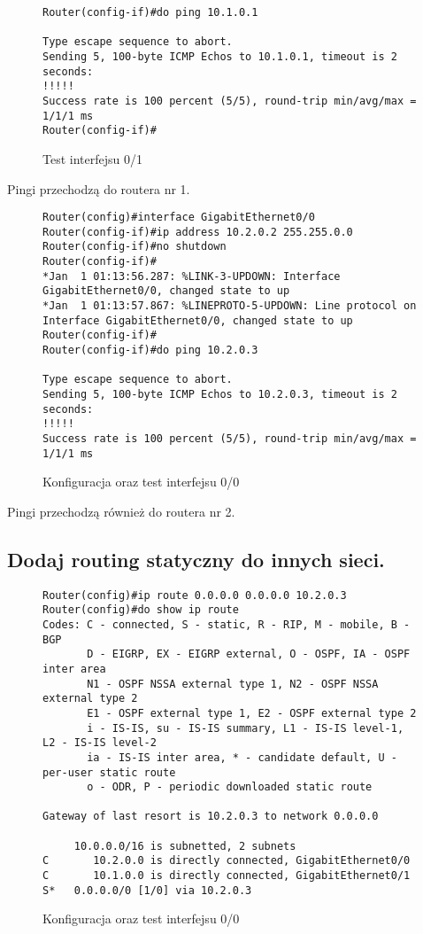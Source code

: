 \documentclass[polish, a4paper]{article}
\begin{document}
\begin{figure}[H]
\begin{verbatim}
Router(config-if)#do ping 10.1.0.1

Type escape sequence to abort.
Sending 5, 100-byte ICMP Echos to 10.1.0.1, timeout is 2 seconds:
!!!!!
Success rate is 100 percent (5/5), round-trip min/avg/max = 1/1/1 ms
Router(config-if)#

\end{verbatim}
\caption{Test interfejsu 0/1}
\end{figure}

Pingi przechodzą do routera nr 1.

\begin{figure}[H]
\begin{verbatim}
Router(config)#interface GigabitEthernet0/0
Router(config-if)#ip address 10.2.0.2 255.255.0.0
Router(config-if)#no shutdown
Router(config-if)#
*Jan  1 01:13:56.287: %LINK-3-UPDOWN: Interface GigabitEthernet0/0, changed state to up
*Jan  1 01:13:57.867: %LINEPROTO-5-UPDOWN: Line protocol on Interface GigabitEthernet0/0, changed state to up
Router(config-if)#
Router(config-if)#do ping 10.2.0.3

Type escape sequence to abort.
Sending 5, 100-byte ICMP Echos to 10.2.0.3, timeout is 2 seconds:
!!!!!
Success rate is 100 percent (5/5), round-trip min/avg/max = 1/1/1 ms

\end{verbatim}
\caption{Konfiguracja oraz test interfejsu 0/0}
\end{figure}

Pingi przechodzą również do routera nr 2.

\subsection{Dodaj routing statyczny do innych sieci.}

\begin{figure}[H]
\begin{verbatim}
Router(config)#ip route 0.0.0.0 0.0.0.0 10.2.0.3
Router(config)#do show ip route
Codes: C - connected, S - static, R - RIP, M - mobile, B - BGP
       D - EIGRP, EX - EIGRP external, O - OSPF, IA - OSPF inter area 
       N1 - OSPF NSSA external type 1, N2 - OSPF NSSA external type 2
       E1 - OSPF external type 1, E2 - OSPF external type 2
       i - IS-IS, su - IS-IS summary, L1 - IS-IS level-1, L2 - IS-IS level-2
       ia - IS-IS inter area, * - candidate default, U - per-user static route
       o - ODR, P - periodic downloaded static route

Gateway of last resort is 10.2.0.3 to network 0.0.0.0

     10.0.0.0/16 is subnetted, 2 subnets
C       10.2.0.0 is directly connected, GigabitEthernet0/0
C       10.1.0.0 is directly connected, GigabitEthernet0/1
S*   0.0.0.0/0 [1/0] via 10.2.0.3
\end{verbatim}
\caption{Konfiguracja oraz test interfejsu 0/0}
\end{figure}
\end{document}
